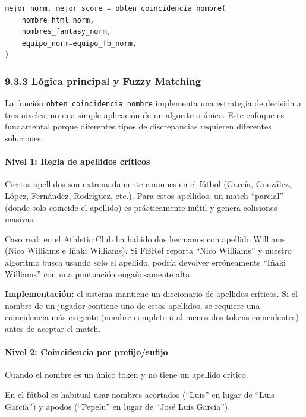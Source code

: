 \begin{lstlisting}[language=Python,caption={Búsqueda contextual de candidatos por partido usando fuzzy matching acotado}]
mejor_norm, mejor_score = obten_coincidencia_nombre(
    nombre_html_norm,
    nombres_fantasy_norm,
    equipo_norm=equipo_fb_norm,
)
\end{lstlisting}
 
\subsubsection{9.3.3 Lógica principal y Fuzzy Matching}
 
La función \texttt{obten\_coincidencia\_nombre} implementa una estrategia de decisión a tres niveles, no una simple aplicación de un algoritmo único.
Este enfoque es fundamental porque diferentes tipos de discrepancias requieren diferentes soluciones.
 
\paragraph{Nivel 1: Regla de apellidos críticos}
 
Ciertos apellidos son extremadamente comunes en el fútbol (García, González, López, Fernández, Rodríguez, etc.). Para estos apellidos, un match
``parcial'' (donde solo coincide el apellido) es prácticamente inútil y genera colisiones masivas.
 
Caso real: en el Athletic Club ha habido dos hermanos con apellido Williams (Nico Williams e Iñaki Williams). Si FBRef reporta ``Nico Williams''
y nuestro algoritmo busca usando solo el apellido, podría devolver erróneamente ``Iñaki Williams'' con una puntuación engañosamente alta.
 
\textbf{Implementación:} el sistema mantiene un diccionario de apellidos críticos. Si el nombre de un jugador contiene uno de estos apellidos,
se requiere una coincidencia más exigente (nombre completo o al menos dos tokens coincidentes) antes de aceptar el match.
 
\paragraph{Nivel 2: Coincidencia por prefijo/sufijo}
 
Cuando el nombre es un único token y no tiene un apellido crítico.
 
En el fútbol es habitual usar nombres acortados (``Luis'' en lugar de ``Luis García'') y apodos (``Pepelu'' en lugar de ``José Luis García'').
 
